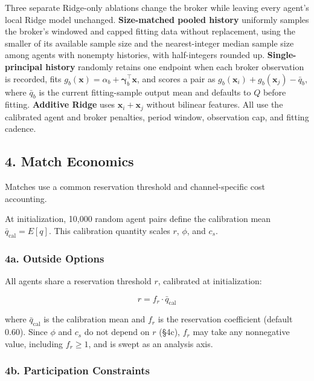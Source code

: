 \documentclass[11pt]{article}
\begin{document}
Three separate Ridge-only ablations change the broker while leaving every agent's local Ridge model unchanged. \textbf{Size-matched pooled history} uniformly samples the broker's windowed and capped fitting data without replacement, using the smaller of its available sample size and the nearest-integer median sample size among agents with nonempty histories, with half-integers rounded up. \textbf{Single-principal history} randomly retains one endpoint when each broker observation is recorded, fits \(g_b(\mathbf x)=\alpha_b+\boldsymbol\gamma_b^\top\mathbf x\), and scores a pair as \(g_b(\mathbf x_i)+g_b(\mathbf x_j)-\bar q_b\), where \(\bar q_b\) is the current fitting-sample output mean and defaults to \(Q\) before fitting. \textbf{Additive Ridge} uses \(\mathbf x_i+\mathbf x_j\) without bilinear features. All use the calibrated agent and broker penalties, period window, observation cap, and fitting cadence.

\subsection{4. Match Economics}\label{match-economics}

Matches use a common reservation threshold and channel-specific cost accounting.

At initialization, 10,000 random agent pairs define the calibration mean \(\bar{q}_{\text{cal}} = E[q]\). This calibration quantity scales \(r\), \(\phi\), and \(c_s\).

\subsubsection{4a. Outside Options}\label{a.-outside-options}

All agents share a reservation threshold \(r\), calibrated at initialization:

\[r = f_r \cdot \bar{q}_{\text{cal}}\]

where \(\bar{q}_{\text{cal}}\) is the calibration mean and \(f_r\) is the reservation coefficient (default 0.60). Since \(\phi\) and \(c_s\) do not depend on \(r\) (§4c), \(f_r\) may take any nonnegative value, including \(f_r \geq 1\), and is swept as an analysis axis.

\subsubsection{4b. Participation Constraints}\label{b.-participation-constraints}
\end{document}
